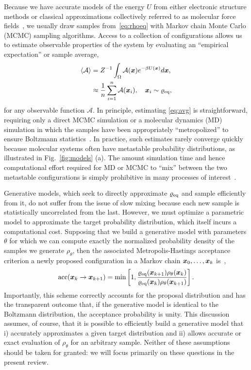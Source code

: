 \documentclass[11pt]{article}
\begin{document}
Because we have accurate models of the energy $U$ from either electronic structure methods or classical approximations collectively referred to as molecular force fields~\cite{case_amber_2005, vanommeslaeghe_charmm_2010}, we usually draw samples from~\eqref{eq:rhoeq} with Markov chain Monte Carlo (MCMC) sampling algorithms.
Access to a collection of configurations allows us to estimate observable properties of the system by evaluating an ``empirical expectation'' or sample average,
\begin{equation}
\begin{aligned}
    \left\langle \mathcal{A} \right\rangle &= Z^{-1} \int_{\Omega} \mathcal{A}(\boldsymbol{x}) e^{-\beta U(\boldsymbol{x})} d\boldsymbol{x}, \\
    &\approx \frac1n \sum_{i=1}^n \mathcal{A}(\boldsymbol{x}_i), \quad \boldsymbol{x}_i \sim \varrho_{\rm eq},
    \label{eq:avg}
\end{aligned}
\end{equation}
for any observable function $\mathcal{A}.$
In principle, estimating \eqref{eq:avg} is straightforward, requiring only a direct MCMC simulation or a molecular dynamics (MD) simulation in which the samples have been appropriately ``metropolized'' to ensure Boltzmann statistics~\cite{frenkel_understanding_2002}. 
In practice, such estimates rarely converge quickly because molecular systems often have metastable probability distributions, as illustrated in Fig.~\ref{fig:models} (a). 
The amount simulation time and hence computational effort required for MD or MCMC to ``mix'' between the two metastable configurations is simply prohibitive in many processes of interest~\cite{lelievre_free_2010}.

Generative models, which seek to directly approximate $\varrho_{\rm eq}$ and sample efficiently from it, do not suffer from the issue of slow mixing because each new sample is statistically uncorrelated from the last.
However, we must optimize a parametric model to approximate the target probability distribution, which itself incurs a computational cost.
Supposing that we build a generative model with parameters $\theta$ for which we can compute exactly the normalized probability density of the samples we generate $\rho_{\theta}$, then the associated Metropolis-Hastings acceptance criterion a newly proposed configuration in a Markov chain $\boldsymbol{x}_0, \dots, \boldsymbol{x}_k$ is~\cite{gabrie_adaptive_2022},
\begin{equation}
    \textrm{acc}(\boldsymbol{x}_k \to \boldsymbol{x}_{k+1}) = \min \left[ 1, \frac{\varrho_{\rm eq}(\boldsymbol{x}_{k+1})\rho_{\theta}(\boldsymbol{x}_{k}) }{\varrho_{\rm eq}(\boldsymbol{x}_{k})\rho_{\theta}(\boldsymbol{x}_{k+1}) }\right].
\end{equation}
Importantly, this scheme correctly accounts for the proposal distribution and has the transparent outcome that, if the generative model is identical to the Boltzmann distribution, the acceptance probability is unity. 
This discussion assumes, of course, that it is possible to efficiently build a generative model that i) accurately approximates a given target distribution and ii) allows accurate or exact evaluation of $\rho_{\theta}$ for an arbitrary sample. 
Neither of these assumptions should be taken for granted: we will focus primarily on these questions in the present review.
\end{document}
